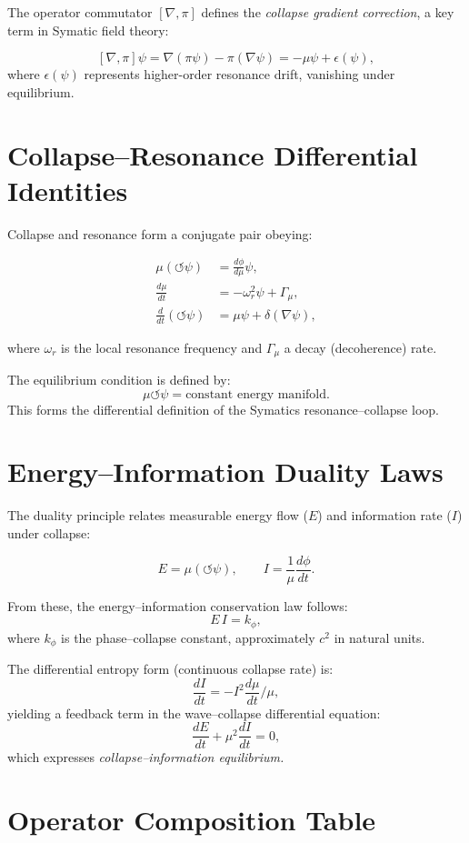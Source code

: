 \documentclass[12pt]{article}
\begin{document}
The operator commutator $[\nabla,\pi]$ defines the \emph{collapse gradient correction}, a key term in Symatic field theory:

\[
[\nabla,\pi]\psi = \nabla(\pi\psi) - \pi(\nabla\psi) = -\mu \psi + \epsilon(\psi),
\]
where $\epsilon(\psi)$ represents higher-order resonance drift, vanishing under equilibrium.

\section{Collapse–Resonance Differential Identities}

Collapse and resonance form a conjugate pair obeying:

\begin{align}
\mu(\circlearrowleft \psi) &= \frac{d\phi}{d\mu} \psi, \\
\frac{d\mu}{dt} &= -\omega_r^2 \psi + \Gamma_\mu, \\
\frac{d}{dt}(\circlearrowleft \psi) &= \mu \psi + \delta(\nabla \psi),
\end{align}

where $\omega_r$ is the local resonance frequency and $\Gamma_\mu$ a decay (decoherence) rate.

The equilibrium condition is defined by:
\[
\mu \circlearrowleft \psi = \text{constant energy manifold.}
\]
This forms the differential definition of the Symatics resonance–collapse loop.

\section{Energy–Information Duality Laws}

The duality principle relates measurable energy flow ($E$) and information rate ($I$) under collapse:

\[
E = \mu(\circlearrowleft \psi), \qquad
I = \frac{1}{\mu}\frac{d\phi}{dt}.
\]

From these, the energy–information conservation law follows:
\[
E \, I = k_\phi,
\]
where $k_\phi$ is the phase–collapse constant, approximately $c^2$ in natural units.

The differential entropy form (continuous collapse rate) is:
\[
\frac{dI}{dt} = -I^2 \frac{d\mu}{dt} / \mu,
\]
yielding a feedback term in the wave–collapse differential equation:
\[
\frac{dE}{dt} + \mu^2 \frac{dI}{dt} = 0,
\]
which expresses \emph{collapse–information equilibrium.}

\section{Operator Composition Table}
\end{document}
